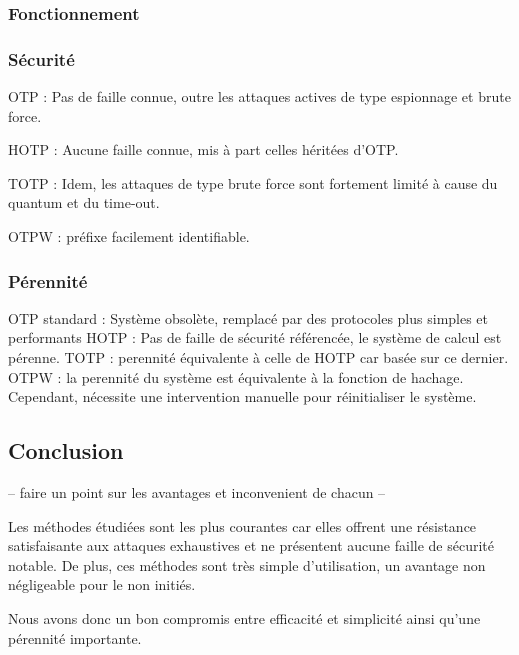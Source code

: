 \subsubsection{Fonctionnement}

\subsubsection{Sécurité}
	OTP : Pas de faille connue, outre les attaques actives de type espionnage
	et brute force.

	HOTP : Aucune faille connue, mis à part celles héritées d'OTP.

	TOTP : Idem, les attaques de type brute force sont fortement limité à cause du quantum et du time-out.

	OTPW : préfixe facilement identifiable.

\subsubsection{Pérennité}

	OTP standard : Système obsolète, remplacé par des protocoles plus simples
	et performants
	HOTP : Pas de faille de sécurité référencée, le système de calcul est
	pérenne.
	TOTP : perennité équivalente à celle de HOTP car basée sur ce dernier.
	OTPW : la perennité du système est équivalente à la fonction de hachage.
	Cependant, nécessite une intervention manuelle pour réinitialiser le
	système.


\subsection{Conclusion}

	-- faire un point sur les avantages et inconvenient de chacun --

	Les méthodes étudiées sont les plus courantes car elles offrent une
	résistance satisfaisante aux attaques exhaustives et ne présentent aucune
	faille de sécurité notable. De plus, ces méthodes sont très simple
	d'utilisation, un avantage non négligeable pour le non initiés.

	Nous avons donc un bon compromis entre efficacité et simplicité ainsi
	qu'une pérennité importante.

